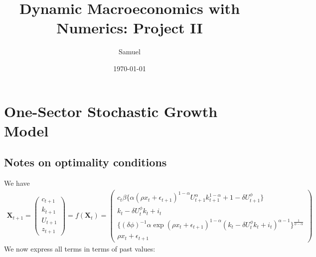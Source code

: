 \documentclass[a4paper]{article}
\title{Dynamic Macroeconomics with Numerics: Project II}
\author{Samuel}
\date{\today}
\theoremstyle{definition}
\begin{document}
\maketitle
\newpage
\section{One-Sector Stochastic Growth Model}
\subsection*{Notes on optimality conditions}
We have
	\begin{align*}
	\mathbf X_{t+1} = 
		\begin{pmatrix}
		c_{t+1} \\ k_{t+1} \\ U_{t+1} \\ z_{t+1} 
		\end{pmatrix}
	= f(\mathbf X_t) = 
		\begin{pmatrix}
		c_t \beta \Big\{ \alpha (\rho x_t + \epsilon_{t+1})^{1-\alpha}U_{t+1}^\alpha k_{t+1}^{1-\alpha} + 1 - \delta U_{t+1}^\phi \Big\} \\
		k_t - \delta U_t^\phi k_t + i_t \\
		\Big\{ (\delta\phi)^{-1}\alpha \exp(\rho x_t + \epsilon_{t+1})^{1-\alpha}(k_t - \delta U_t^\phi k_t + i_t)^{\alpha-1} \Big\}^{\frac{1}{\phi-\alpha}} \\
		\rho x_t + \epsilon_{t+1}
		\end{pmatrix}	
	\end{align*}
We now express all terms in terms of past values:
\end{document}
